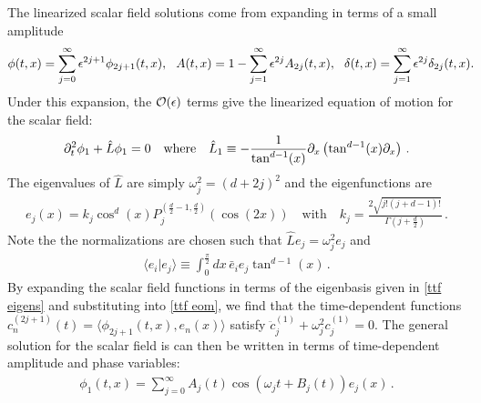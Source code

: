 \documentclass[../PhD.tex]{subfiles}
\begin{document}
The linearized scalar field solutions come from expanding in terms of a small amplitude
\begin{align}
\label{eps expansion}
\phi(t,x) = \sum_{j=0}^\infty \epsilon^{2j+1} \phi_{2j+1}(t,x), \quad \! \! A(t,x) = 1 - \sum_{j=1}^\infty \epsilon^{2j} A_{2j}(t,x), \quad \! \! \delta(t,x) = \sum_{j=1}^\infty \epsilon^{2j} \delta_{2j} (t,x) . \hspace{-0.1in}
\end{align}
Under this expansion, the $\mathcal O(\epsilon)$ terms give the linearized equation of motion for the scalar field:
\begin{align}
\label{ttf eom}
\partial^2_t \phi_1 + \hat L \phi_1 = 0 \quad \text{where} \quad \hat L_1 \equiv - \frac{1}{\tan^{d-1}(x)} \partial_x \left( \tan^{d-1}(x) \partial_x \right) \, .
\end{align}
The eigenvalues of $\hat L$ are simply $\omega^2_j = \left(d + 2j\right)^2$ and the eigenfunctions are
\begin{align}
\label{ttf eigens}
e_j (x) = k_j \cos^d (x) P^{(\frac{d}{2} - 1, \frac{d}{2})}_j \left( \cos(2x) \right) \quad \text{with} \quad k_j = \frac{2 \sqrt{j! (j + d - 1)!}}{\Gamma(j + \frac{d}{2})} \, .
\end{align}
Note the the normalizations are chosen such that $\hat L e_j = \omega^2_j e_j$ and 
\begin{align}
\langle e_i | e_j \rangle \equiv \int^{\frac{\pi}{2}}_0 dx \, \bar e_i e_j \tan^{d-1}(x) \, .
\end{align}
By expanding the scalar field functions in terms of the eigenbasis given in \eqref{ttf eigens} and substituting into \eqref{ttf eom}, we find that the time-dependent functions $c^{(2j + 1)}_n (t) = \langle \phi_{2j + 1}(t,x), e_n (x) \rangle$ satisfy $\ddot c_j^{(1)} + \omega^2_j c_j^{(1)} = 0$. The general solution for the scalar field is can then be written in terms of time-dependent amplitude and phase variables:
\begin{align}
\label{ttf phi}
\phi_1 (t,x) = \sum_{j=0}^\infty A_j (t) \cos \left(\omega_j t + B_j(t) \right) e_j (x) \, .
\end{align}
\end{document}
